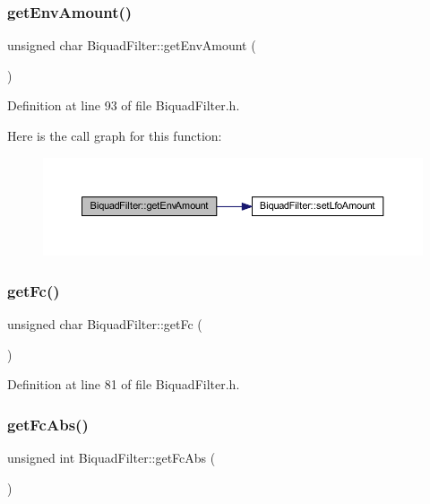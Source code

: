\subsubsection{\texorpdfstring{get\+Env\+Amount()}{getEnvAmount()}}
{\footnotesize\ttfamily unsigned char Biquad\+Filter\+::get\+Env\+Amount (\begin{DoxyParamCaption}{ }\end{DoxyParamCaption})\hspace{0.3cm}{\ttfamily [inline]}}



Definition at line 93 of file Biquad\+Filter.\+h.

Here is the call graph for this function\+:
\nopagebreak
\begin{figure}[H]
\begin{center}
\leavevmode
\includegraphics[width=350pt]{class_biquad_filter_a00fd6c36ca50169705ad5c00560341d9_cgraph}
\end{center}
\end{figure}
\mbox{\label{class_biquad_filter_ada8a6004b4a56843483e56c0697a5531}} 
\subsubsection{\texorpdfstring{get\+Fc()}{getFc()}}
{\footnotesize\ttfamily unsigned char Biquad\+Filter\+::get\+Fc (\begin{DoxyParamCaption}{ }\end{DoxyParamCaption})\hspace{0.3cm}{\ttfamily [inline]}}



Definition at line 81 of file Biquad\+Filter.\+h.

\mbox{\label{class_biquad_filter_ab2e914c95e8d312bbc47a476f5d71945}} 
\subsubsection{\texorpdfstring{get\+Fc\+Abs()}{getFcAbs()}}
{\footnotesize\ttfamily unsigned int Biquad\+Filter\+::get\+Fc\+Abs (\begin{DoxyParamCaption}{ }\end{DoxyParamCaption})\hspace{0.3cm}{\ttfamily [inline]}}



